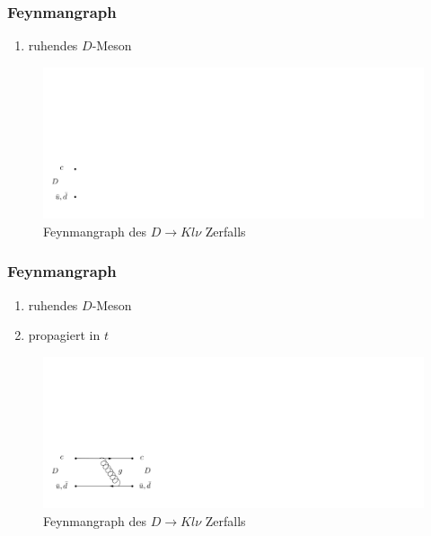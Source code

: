 \documentclass[hyperref={pdfpagelabels=false}]{beamer}
\begin{document}
\begin{frame}
 \frametitle{Feynmangraph}
  \setcounter{framenumber}{5}
\begin{minipage}[h]{0.38\textwidth}
 \begin{enumerate}
  \item ruhendes $D$-Meson
 \end{enumerate}
\end{minipage}
\begin{minipage}[h]{0.58\textwidth}
  \begin{figure}[h]
  \includegraphics[width = 1.9\textwidth]{../Abbildungen/DFeyn1.png}
   \caption{Feynmangraph des $D\rightarrow Kl\nu$ Zerfalls}
 \end{figure}
\end{minipage}
\end{frame}

\begin{frame}
 \frametitle{Feynmangraph}
\setcounter{framenumber}{5}
\begin{minipage}[h]{0.38\textwidth}
 \begin{enumerate}
  \item ruhendes $D$-Meson
  \item propagiert in $t$
 \end{enumerate}
\end{minipage}
\begin{minipage}[h]{0.58\textwidth}
  \begin{figure}[h]
  \includegraphics[width = 1.9\textwidth]{../Abbildungen/DFeyn2.png}
   \caption{Feynmangraph des $D\rightarrow Kl\nu$ Zerfalls}
 \end{figure}
\end{minipage}
\end{frame}
\end{document}
